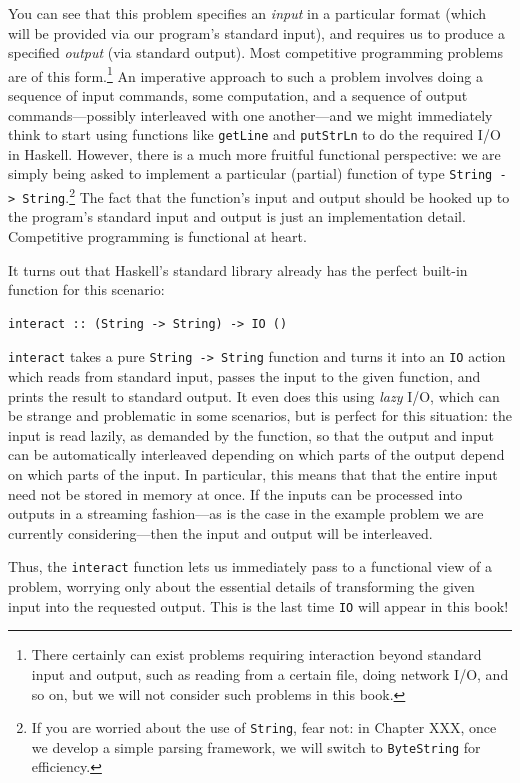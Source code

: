 \documentclass{book}
\newcommand{\h}[1]{\texttt{#1}}
\begin{document}
You can see that this problem specifies an \emph{input} in a
particular format (which will be provided via our program's standard
input), and requires us to produce a specified \emph{output} (via
standard output).  Most competitive programming problems are of this
form.\footnote{There certainly can exist problems requiring
  interaction beyond standard input and output, such as reading from a
  certain file, doing network I/O, and so on, but we will not consider
  such problems in this book.} An imperative approach to such a
problem involves doing a sequence of input commands, some computation,
and a sequence of output commands---possibly interleaved with one
another---and we might immediately think to start using functions like
\h{getLine} and \h{putStrLn} to do the required I/O in Haskell.  However,
there is a much more fruitful functional perspective: we are simply
being asked to implement a particular (partial) function of type
\h{String -> String}.\footnote{If you are worried about the use of
  \h{String}, fear not: in Chapter XXX, once we develop a simple parsing
  framework, we will switch to \h{ByteString} for efficiency.}  The fact
that the function's input and output should be hooked up to the
program's standard input and output is just an implementation detail.
Competitive programming is functional at heart.

It turns out that Haskell's standard library already has the perfect
built-in function for this scenario:
\begin{verbatim}
interact :: (String -> String) -> IO ()
\end{verbatim}
\h{interact} takes a pure \h{String -> String} function and turns it into
an \h{IO} action which reads from standard input, passes the input to
the given function, and prints the result to standard output.  It even
does this using \emph{lazy} I/O, which can be strange and problematic
in some scenarios, but is perfect for this situation: the input is
read lazily, as demanded by the function, so that the output and input
can be automatically interleaved depending on which parts of the
output depend on which parts of the input. In particular, this means
that that the entire input need not be stored in memory at once. If
the inputs can be processed into outputs in a streaming fashion---as
is the case in the example problem we are currently
considering---then the input and output will be interleaved.

Thus, the \h{interact} function lets us immediately pass to a functional
view of a problem, worrying only about the essential details of
transforming the given input into the requested output.  This is the
last time \h{IO} will appear in this book! 
\end{document}
